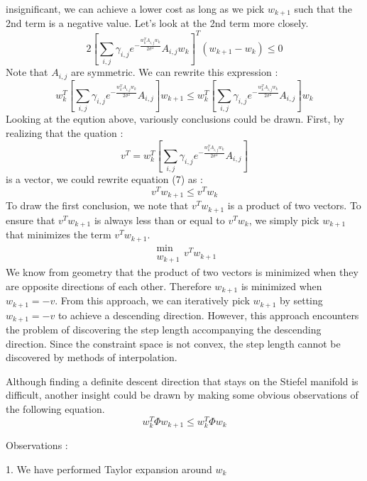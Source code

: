 \documentclass{article}
\begin{document}
insignificant, we can achieve a lower cost as long as we pick $w_{k + 1}$ such
that the 2nd term is a negative value. Let's look at the 2nd term more
closely.
\[ 2 \left[ \sum_{i, j} \gamma_{i, j} e^{- \frac{w^T_k A_{i, j} w_k}{2
   \sigma^2}} A_{i, j} w_k \right]^T  (w_{k + 1} - w_k) \leq 0 \]
Note that $A_{i, j}$ are symmetric. We can rewrite this expression :
\begin{equation}
  w_k^T \left[ \sum_{i, j} \gamma_{i, j} e^{- \frac{w^T_k A_{i, j} w_k}{2
  \sigma^2}} A_{i, j} \right] w_{k + 1} \leq w_k^T \left[ \sum_{i, j}
  \gamma_{i, j} e^{- \frac{w^T_k A_{i, j} w_k}{2 \sigma^2}} A_{i, j} \right]
  w_k
\end{equation}
Looking at the eqution above, variously conclusions could be drawn. First, by
realizing that the quation :
\[ v^T = w_k^T \left[ \sum_{i, j} \gamma_{i, j} e^{- \frac{w^T_k A_{i, j}
   w_k}{2 \sigma^2}} A_{i, j} \right] \]
is a vector, we could rewrite equation (7) as :
\[ v^T w_{k + 1} \leq v^T w_k \]
To draw the first conclusion, we note that $v^T w_{k + 1}$ is a product of two
vectors. To ensure that $v^T w_{k + 1}$ is always less than or equal to $v^T
w_k$, we simply pick $w_{k + 1}$ that minimizes the term $v^T w_{k + 1}$.
\[ \begin{array}{l}
     \min\\
     w_{k + 1}
   \end{array} v^T w_{k + 1} \]
We know from geometry that the product of two vectors is minimized when they
are opposite directions of each other. Therefore $w_{k + 1}$ is minimized when
$w_{k + 1} = - v$. From this approach, we can iteratively pick $w_{k + 1}$ by
setting $w_{k + 1} = - v$ to achieve a descending direction. However, this
approach encounters the problem of discovering the step length accompanying
the descending direction. Since the constraint space is not convex, the step
length cannot be discovered by methods of interpolation.



Although finding a definite descent direction that stays on the Stiefel
manifold is difficult, another insight could be drawn by making some obvious
observations of the following equation.
\begin{equation}
  w_k^T \Phi w_{k + 1} \leq w_k^T \Phi w_k
\end{equation}


Observations :



1. We have performed Taylor expansion around $w_k$
\end{document}
